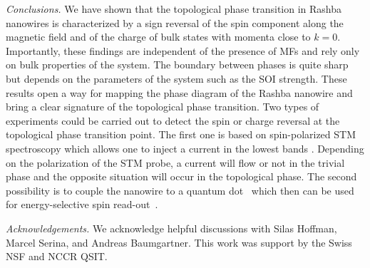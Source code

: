\documentclass[prl,twocolumn,showpacs,floatfix,amsbsy,amsbsy,superscriptaddress]{revtex4-1}
\begin{document}
\emph{Conclusions.}  
We have shown that the topological phase transition in Rashba nanowires is characterized by a sign reversal of the spin component along the magnetic field and of the charge of bulk states with momenta close to $k=0$. Importantly, these findings are independent of the presence of MFs and rely only on bulk properties of the system. 
The boundary between phases is quite sharp but depends on the parameters of the system such as the SOI strength. These results open a way for mapping the phase diagram of the Rashba nanowire and bring a clear signature of the topological phase transition. Two types of experiments could be carried out to detect the spin or charge reversal at the topological phase transition point. The first one is based on  spin-polarized STM spectroscopy which allows one to inject a current in the lowest bands \cite{Yazdani,Franke,Meyer,STM}. Depending on the polarization of the STM probe, a current will flow or not in the trivial phase and the opposite situation will occur in the topological phase.  The second possibility is to couple the nanowire to a quantum dot~\cite{Carlos,dot1,DeFranceschi2,Kouwenhoven_2016,Deng_Marcus_Science2017} which then can be used for 
energy-selective spin read-out~\cite{HansonRMP_2007}.


{\it Acknowledgements.} We acknowledge helpful discussions with Silas Hoffman, Marcel Serina, and Andreas Baumgartner. This work was support by the Swiss NSF and  NCCR QSIT.
\end{document}
